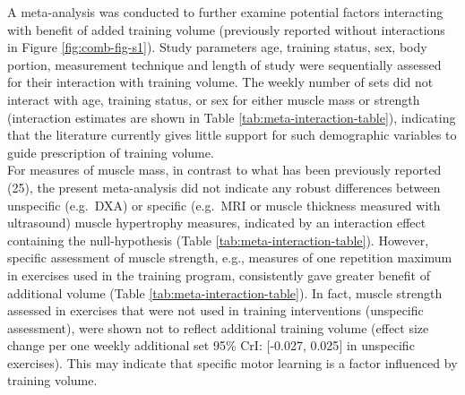 \documentclass[twoside,10pt]{gihclass} %
\begin{document}
A meta-analysis was conducted to further examine potential factors interacting with benefit of added training volume (previously reported without interactions in Figure \ref{fig:comb-fig-s1}). Study parameters age, training status, sex, body portion, measurement technique and length of study were sequentially assessed for their interaction with training volume. The weekly number of sets did not interact with age, training status, or sex for either muscle mass or strength (interaction estimates are shown in Table \ref{tab:meta-interaction-table}), indicating that the literature currently gives little support for such demographic variables to guide prescription of training volume.\\
For measures of muscle mass, in contrast to what has been previously reported
(25),
the present meta-analysis did not indicate any robust differences between unspecific (e.g.~DXA) or specific (e.g.~MRI or muscle thickness measured with ultrasound) muscle hypertrophy measures, indicated by an interaction effect containing the null-hypothesis (Table \ref{tab:meta-interaction-table}).
However, specific assessment of muscle strength, e.g., measures of one repetition maximum in exercises used in the training program, consistently gave greater benefit of additional volume (Table \ref{tab:meta-interaction-table}).
In fact, muscle strength assessed in exercises that were not used in training interventions (unspecific assessment), were shown not to reflect additional training volume (effect size change per one weekly additional set 95\% CrI: {[}-0.027, 0.025{]} in unspecific exercises). This may indicate that specific motor learning is a factor influenced by training volume.
\end{document}
